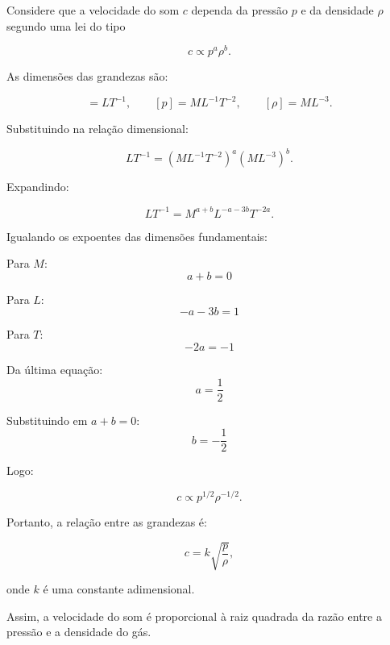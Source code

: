 
Considere que a velocidade do som $c$ dependa da pressão $p$ e da densidade $\rho$ segundo uma lei do tipo

\begin{equation}
    c \propto p^{a}\rho^{b}.    
\end{equation}

As dimensões das grandezas são:

\begin{equation}
   [c]=LT^{-1}, 
\qquad 
    [p]=ML^{-1}T^{-2}, 
\qquad 
    [\rho]=ML^{-3}. 
\end{equation}

Substituindo na relação dimensional:

\begin{equation}
     LT^{-1}=(ML^{-1}T^{-2})^{a}(ML^{-3})^{b}.  
\end{equation}

Expandindo:

\begin{equation}
    LT^{-1}=M^{a+b}L^{-a-3b}T^{-2a}.   
\end{equation}


Igualando os expoentes das dimensões fundamentais:

Para $M$:
\begin{equation}
        a + b = 0
\end{equation}

Para $L$:
\begin{equation}
        -a - 3b = 1
\end{equation}

Para $T$:
\begin{equation}
        -2a = -1
\end{equation}

Da última equação:
\begin{equation}
        a = \frac{1}{2}
\end{equation}

Substituindo em $a + b = 0$:
\begin{equation}
        b = -\frac{1}{2}
\end{equation}

Logo:

\begin{equation}
    c \propto p^{1/2}\rho^{-1/2}.
\end{equation}

Portanto, a relação entre as grandezas é:

\begin{equation}
    c = k\sqrt{\frac{p}{\rho}},  
\end{equation}

\noindent onde \(k\) é uma constante adimensional.

Assim, a velocidade do som é proporcional à raiz quadrada da razão entre a pressão e a densidade do gás.